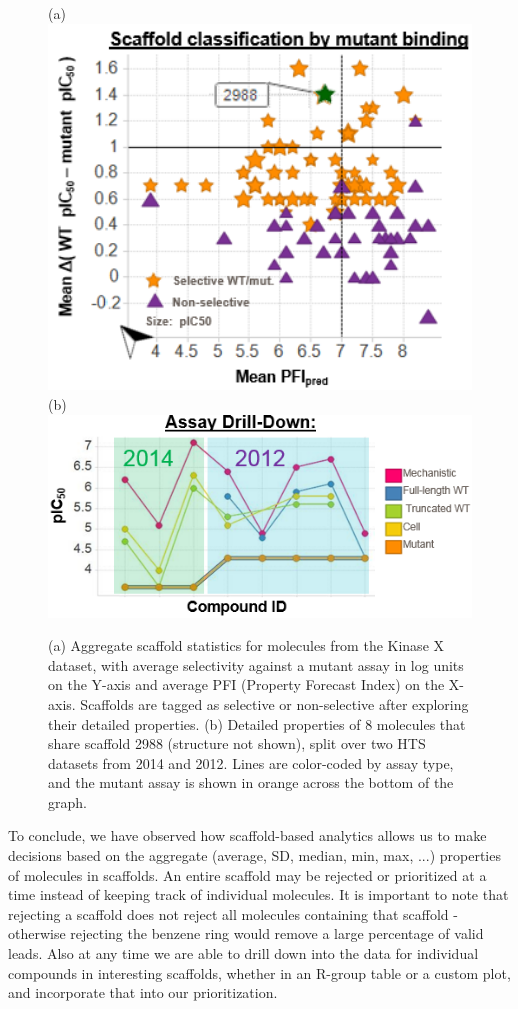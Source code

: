 \documentclass[journal=jacsat,manuscript=article]{achemso}
\begin{document}
\begin{figure}
  (a)\includegraphics[width=5in]{fig/KinaseX_RG_aggr.png}\\
  (b)\includegraphics[width=5in]{fig/KinaseX_RG_drill.png}
  \caption{(a) Aggregate scaffold statistics for molecules from the Kinase X dataset, with average selectivity against a mutant assay in log units on the Y-axis and average PFI (Property Forecast Index) on the X-axis.  Scaffolds are tagged as selective or non-selective after exploring their detailed properties. (b) Detailed properties of 8 molecules that share scaffold 2988 (structure not shown), split over two HTS datasets from 2014 and 2012. Lines are color-coded by assay type, and the mutant assay is shown in orange across the bottom of the graph.   
  }
\label{fig:KinaseX}   
\end{figure}


To conclude, we have observed how scaffold-based analytics allows us to make decisions based on the aggregate (average, SD, median, min, max, ...) properties of molecules in scaffolds. An entire scaffold may be rejected or prioritized at a time instead of keeping track of individual molecules. It is important to note that rejecting a scaffold does not reject all molecules containing that scaffold - otherwise rejecting the benzene ring would remove a large percentage of valid leads. Also at any time we are able to drill down into the data for individual compounds in interesting scaffolds, whether in an R-group table or a custom plot, and incorporate that into our prioritization.   
\end{document}

